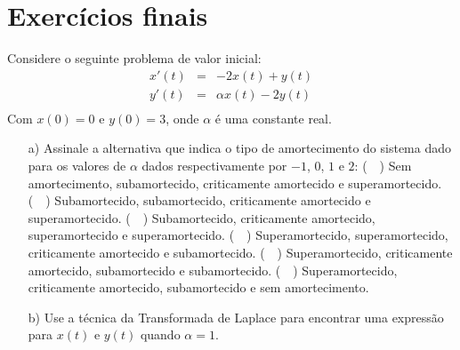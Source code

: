 \section*{Exercícios finais}
\begin{exer}
Considere o seguinte problema de valor inicial:
\begin{eqnarray*}
x'(t)&=&-2x(t) +  y(t)\\
y'(t)&=&\alpha x(t) - 2y(t)\\
\end{eqnarray*}
Com $x(0)=0$ e $y(0)=3$, onde $\alpha$ é uma constante real.
\begin{itemize}
 \item[a)] Assinale a alternativa que indica o tipo de amortecimento do sistema dado para os valores de $\alpha$ dados respectivamente por $-1$, $0$, $1$ e $2$:
 \subitem(~~) Sem amortecimento, subamortecido, criticamente amortecido e superamortecido.
 \subitem(~~) Subamortecido, subamortecido, criticamente amortecido e superamortecido.
 \subitem(~~) Subamortecido, criticamente amortecido, superamortecido e superamortecido.
 \subitem(~~) Superamortecido, superamortecido, criticamente amortecido e subamortecido.
 \subitem(~~) Superamortecido, criticamente amortecido, subamortecido e subamortecido.
 \subitem(~~) Superamortecido, criticamente amortecido, subamortecido e sem amortecimento.
\item [b)] Use a técnica da Transformada de Laplace para encontrar uma expressão para $x(t)$ e $y(t)$ quando $\alpha=1$. 
\end{itemize}
\end{exer}
